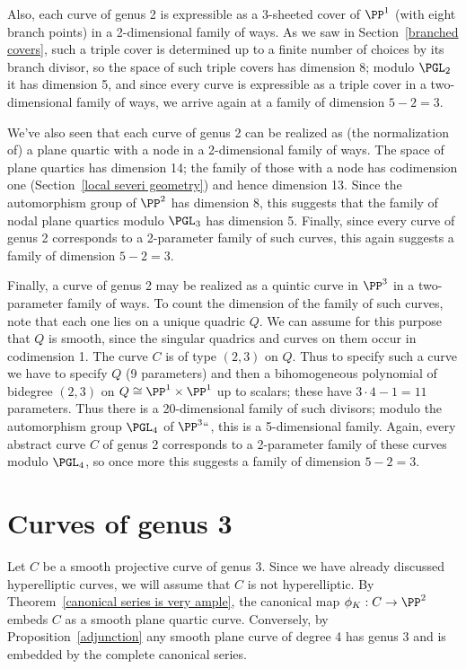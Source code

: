 Also, each curve  of genus 2 is expressible as a 3-sheeted cover of
$\PP^1$ (with eight branch points) in a 2-dimensional family of ways. As
we saw in Section~\ref{branched covers}, such a triple cover is determined
up to a finite number of choices by its branch divisor, so the space of
such triple covers has dimension 8; modulo $\PGL_2$ it has dimension 5, and
%
since every curve is expressible as a triple cover in a two-dimensional
family of ways, we arrive again at a family of dimension $ 5-2 = 3$.

We've also seen that each curve of genus 2 can be realized as (the
normalization of) a plane quartic  with a node in a 2-dimensional family
%
of ways. The space of plane quartics has dimension 14; the family
of those with a node has codimension one
(Section~\ref{local severi geometry})
and hence dimension 13. Since  the automorphism group 
%
of $\PP^2$ has dimension 8, this suggests that the family of nodal
plane quartics modulo $\PGL_3$ has dimension 5. Finally, since every
curve of genus 2 corresponds to a 2-parameter family of such curves,
this again suggests a family of dimension $ 5-2=3$.

Finally, a curve of genus 2 may be realized as a quintic curve in $\PP^3$
in a two-parameter family of ways. To count the dimension of the family
of such curves, note that each one lies on a unique quadric $Q$. We can
assume for this purpose that $Q$ is smooth, since the singular quadrics
and curves on them occur in codimension 1. The curve $C$ is of type
$(2,3)$ on $Q$. Thus to specify such a curve we have to specify $Q$
(9 parameters) and then a bihomogeneous polynomial of bidegree $(2,3)$
on $Q \cong \PP^1 \times \PP^1$ up to scalars; these have $3\cdot 4 - 1 =
11$ parameters. Thus there is a 20-dimensional family of such divisors;
modulo the automorphism group $\PGL_4$ of $\PP^3` `$, this is a 5-dimensional
family. Again, every abstract curve $C$ of genus 2 corresponds to a
2-parameter family of these curves modulo $\PGL_4$, so once more this
suggests a family of dimension $ 5 - 2 = 3$.

\section{Curves of genus 3}

Let $C$ be a smooth projective curve of genus 3. Since we have already
discussed hyperelliptic curves,
we will assume  that $C$ is not hyperelliptic. By
Theorem~\ref{canonical series is very ample}, the canonical map
$\phi_K : C \to \PP^2$ embeds $C$ as a smooth plane quartic curve.
%
Conversely, by Proposition~\ref{adjunction} any smooth plane curve of
degree 4 has genus 3 and is embedded by the complete canonical series.

